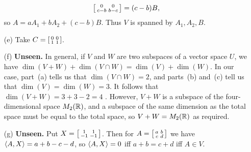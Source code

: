 \documentclass[a4paper]{article}
\begin{document}
\begin{solution}
\begin{itemize}
\[       \left[\begin{smallmatrix} 0&0 \\ c-b & b-c\end{smallmatrix}\right] = (c-b) B,
   \]
   so $A=aA_1+bA_2+(c-b)B$.  Thus $V$ is spanned by $A_1,A_2,B$. 
  \item[(e)] Take $C=\left[\begin{smallmatrix} 0&0\\1&1\end{smallmatrix}\right]$. 
  \item[(f)] \textbf{Unseen.}
   In general, if $V$ and $W$ are two subspaces of a vector
   space $U$, we have $\dim(V+W)+\dim(V\cap W)=\dim(V)+\dim(W)$.  In
   our case, part~(a) tells us that $\dim(V\cap W)=2$, and parts~(b)
   and~(c) tell us that $\dim(V)=\dim(W)=3$.  It follows that
   $\dim(V+W)=3+3-2=4$ .  However, $V+W$ is a subspace of the
   four-dimensional space $M_2({\mathbb{R}})$, and a subspace of the same
   dimension as the total space must be equal to the total space, so
   $V+W=M_2({\mathbb{R}})$ as required. \mk
  \item[(g)] \textbf{Unseen.} Put $X=\left[\begin{smallmatrix} 1&1\\-1&-1\end{smallmatrix}\right]$.  Then for
   $A=\left[\begin{smallmatrix} a&b\\ c&d\end{smallmatrix}\right]$ we have $\langle A,X\rangle=a+b-c-d$, so $\langle A,X\rangle=0$
   iff $a+b=c+d$ iff $A\in V$. 
 \end{itemize}
\end{solution}
\end{document}
